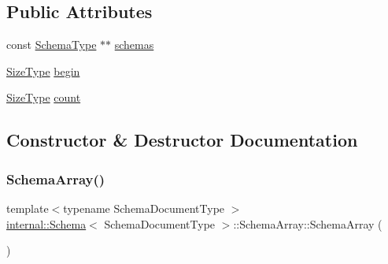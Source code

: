 \subsection*{Public Attributes}
\begin{DoxyCompactItemize}
\item 
const \hyperlink{classinternal_1_1Schema_ac2556ebf7a7db971e1c1c0f76eb5786e}{Schema\+Type} $\ast$$\ast$ \hyperlink{structinternal_1_1Schema_1_1SchemaArray_a5b25dcc899a43aec06270dfefca2c742}{schemas}
\item 
\hyperlink{rapidjson_8h_a5ed6e6e67250fadbd041127e6386dcb5}{Size\+Type} \hyperlink{structinternal_1_1Schema_1_1SchemaArray_aec3fb901025ec5fd76b7f534670f6d6a}{begin}
\item 
\hyperlink{rapidjson_8h_a5ed6e6e67250fadbd041127e6386dcb5}{Size\+Type} \hyperlink{structinternal_1_1Schema_1_1SchemaArray_adeea8252bb8f70972a0669c671953414}{count}
\end{DoxyCompactItemize}


\subsection{Constructor \& Destructor Documentation}
\mbox{\label{structinternal_1_1Schema_1_1SchemaArray_a062fd366af3b0accd2f6f5d6a379183c}} 
\subsubsection{\texorpdfstring{Schema\+Array()}{SchemaArray()}}
{\footnotesize\ttfamily template$<$typename Schema\+Document\+Type $>$ \\
\hyperlink{classinternal_1_1Schema}{internal\+::\+Schema}$<$ Schema\+Document\+Type $>$\+::Schema\+Array\+::\+Schema\+Array (\begin{DoxyParamCaption}{ }\end{DoxyParamCaption})\hspace{0.3cm}{\ttfamily [inline]}}

\mbox{\label{structinternal_1_1Schema_1_1SchemaArray_a9745826807e4dede68ef3b9287afa867}} 
